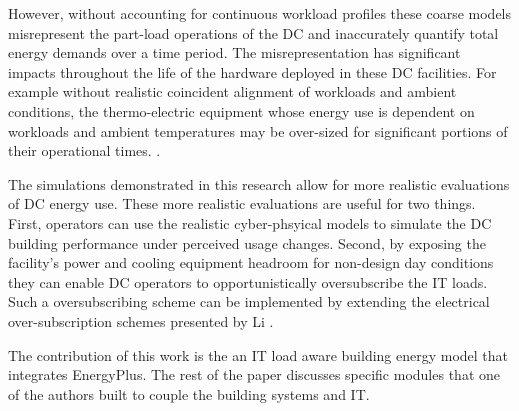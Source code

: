 
However, without accounting for continuous workload profiles these coarse models misrepresent the part-load operations of the DC and inaccurately quantify total energy demands over a time period. The misrepresentation has significant impacts throughout the life of the hardware deployed in these DC facilities. For example without realistic coincident alignment of workloads and ambient conditions, the thermo-electric equipment whose energy use is dependent on workloads and ambient temperatures may be over-sized for significant portions of their operational times. . 

The simulations demonstrated in this research allow for more realistic evaluations of DC energy use. These more realistic evaluations are useful for two things. First, operators can use the realistic cyber-phsyical models to simulate the DC building performance under perceived usage changes. Second, by exposing the facility's power and cooling equipment headroom for non-design day conditions they can enable DC operators to opportunistically oversubscribe the IT loads. Such a oversubscribing scheme can be implemented by extending the electrical over-subscription  schemes presented by Li \citep{Li18} .

The contribution of this work is the  an IT load aware building energy model that integrates   EnergyPlus.  The rest of the paper discusses specific modules that one of the authors built to couple the building systems and IT. 

